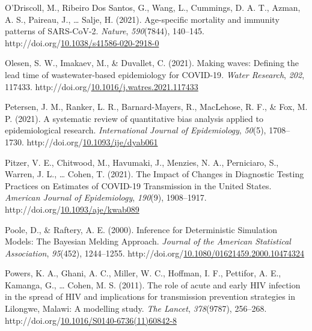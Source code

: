 \documentclass[12pt,twoside]{smiththesis}
\newlength{\cslhangindent}
\newenvironment{CSLReferences}[2] %
 {%
\setlength{\parindent}{0pt}
\ifodd #1 \everypar{\setlength{\hangindent}{\cslhangindent}}\ignorespaces\fi
\ifnum #2 > 0
\setlength{\parskip}{#2\baselineskip}
  \fi
}%
{}
\begin{document}
\begin{CSLReferences}{1}{0}
\leavevmode{}%
O'Driscoll, M., Ribeiro Dos Santos, G., Wang, L., Cummings, D. A. T., Azman, A. S., Paireau, J., \ldots{} Salje, H. (2021). Age-specific mortality and immunity patterns of {SARS-CoV-2}. \emph{Nature}, \emph{590}(7844), 140--145. http://doi.org/\href{https://doi.org/10.1038/s41586-020-2918-0}{10.1038/s41586-020-2918-0}

\leavevmode{}%
Olesen, S. W., Imakaev, M., \& Duvallet, C. (2021). Making waves: {Defining} the lead time of wastewater-based epidemiology for {COVID-19}. \emph{Water Research}, \emph{202}, 117433. http://doi.org/\href{https://doi.org/10.1016/j.watres.2021.117433}{10.1016/j.watres.2021.117433}

\leavevmode{}%
Petersen, J. M., Ranker, L. R., Barnard-Mayers, R., MacLehose, R. F., \& Fox, M. P. (2021). A systematic review of quantitative bias analysis applied to epidemiological research. \emph{International Journal of Epidemiology}, \emph{50}(5), 1708--1730. http://doi.org/\href{https://doi.org/10.1093/ije/dyab061}{10.1093/ije/dyab061}

\leavevmode{}%
Pitzer, V. E., Chitwood, M., Havumaki, J., Menzies, N. A., Perniciaro, S., Warren, J. L., \ldots{} Cohen, T. (2021). The {Impact} of {Changes} in {Diagnostic Testing Practices} on {Estimates} of {COVID-19 Transmission} in the {United States}. \emph{American Journal of Epidemiology}, \emph{190}(9), 1908--1917. http://doi.org/\href{https://doi.org/10.1093/aje/kwab089}{10.1093/aje/kwab089}

\leavevmode{}%
Poole, D., \& Raftery, A. E. (2000). Inference for {Deterministic Simulation Models}: {The Bayesian Melding Approach}. \emph{Journal of the American Statistical Association}, \emph{95}(452), 1244--1255. http://doi.org/\href{https://doi.org/10.1080/01621459.2000.10474324}{10.1080/01621459.2000.10474324}

\leavevmode{}%
Powers, K. A., Ghani, A. C., Miller, W. C., Hoffman, I. F., Pettifor, A. E., Kamanga, G., \ldots{} Cohen, M. S. (2011). The role of acute and early {HIV} infection in the spread of {HIV} and implications for transmission prevention strategies in {Lilongwe}, {Malawi}: A modelling study. \emph{The Lancet}, \emph{378}(9787), 256--268. http://doi.org/\href{https://doi.org/10.1016/S0140-6736(11)60842-8}{10.1016/S0140-6736(11)60842-8}


\end{CSLReferences}
\end{document}

